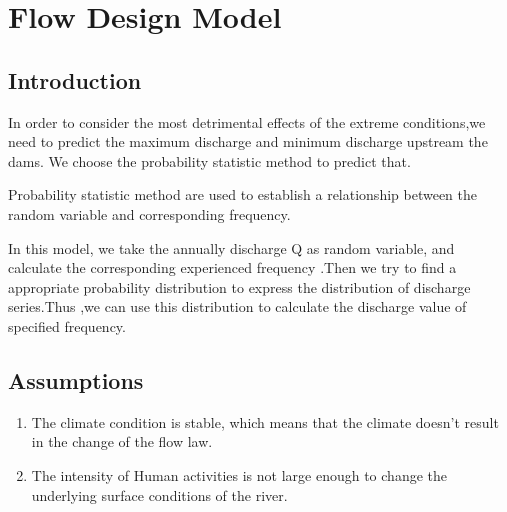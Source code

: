 \documentclass[12pt]{article}%
\begin{document}

\section{Flow Design Model}
\subsection{Introduction}
	In order to consider the most detrimental effects of the extreme conditions,we need to predict the maximum discharge and minimum discharge upstream the dams. We choose the probability statistic method to predict that.\par\noindent 
Probability statistic method are used to establish a relationship between the random variable and corresponding frequency.
\par\noindent
In this model, we take the annually discharge Q as random variable, and calculate the corresponding experienced frequency .Then we try to find a appropriate probability distribution to express the distribution of discharge series.Thus ,we can use this distribution to calculate the discharge value of specified frequency.
\subsection{Assumptions}
\begin{enumerate}[(1)]
	\item The climate condition is stable, which means that the climate doesn’t result in the change of the flow law.
	\item The intensity of Human activities is not large enough to change the underlying surface conditions of the river.
\end{enumerate}
\end{document}
